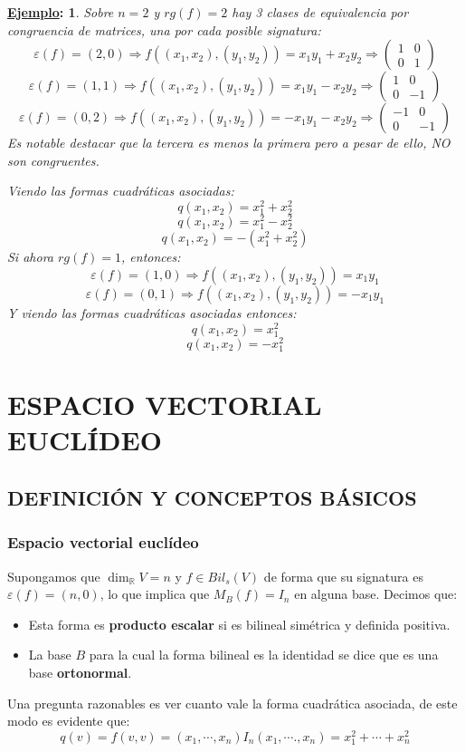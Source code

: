 \documentclass[10pt,a4paper,openright]{book}
\theoremstyle{break}
\newtheorem*{ej}{\underline{Ejemplo}:}
\begin{document}
\begin{ej}
Sobre $n= 2$ y $rg(f)=2$ hay 3 clases de equivalencia por congruencia de matrices, una por cada posible signatura:
$$\varepsilon(f)=(2,0)\Rightarrow f((x_1,x_2),(y_1,y_2)) = x_1y_1+x_2y_2 \Rightarrow \begin{pmatrix} 1 & 0 \\ 0 & 1\end{pmatrix}$$
$$\varepsilon(f)=(1,1)\Rightarrow f((x_1,x_2),(y_1,y_2)) = x_1y_1-x_2y_2 \Rightarrow \begin{pmatrix} 1 & 0 \\ 0 & -1\end{pmatrix}$$
$$\varepsilon(f)=(0,2)\Rightarrow f((x_1,x_2),(y_1,y_2)) = -x_1y_1-x_2y_2 \Rightarrow \begin{pmatrix} -1 & 0 \\ 0 & -1\end{pmatrix}$$
Es notable destacar que la tercera es menos la primera pero a pesar de ello, NO son congruentes.

Viendo las formas cuadráticas asociadas:
$$q(x_1,x_2) = x_1^2+x_2^2$$
$$q(x_1,x_2) = x_1^2-x_2^2$$
$$q(x_1,x_2) = -(x_1^2+x_2^2)$$
Si ahora $rg(f)=1$, entonces:
$$\varepsilon(f)=(1,0)\Rightarrow f((x_1,x_2),(y_1,y_2)) = x_1y_1$$
$$\varepsilon(f)=(0,1)\Rightarrow f((x_1,x_2),(y_1,y_2)) = -x_1y_1$$
Y viendo las formas cuadráticas asociadas entonces:
$$q(x_1,x_2) = x_1^2$$
$$q(x_1,x_2) = -x_1^2$$
\end{ej}

\chapter*{ESPACIO VECTORIAL EUCLÍDEO}
\section*{DEFINICIÓN Y CONCEPTOS BÁSICOS}
\subsection{Espacio vectorial euclídeo}
Supongamos que $\dim_{\mathbb R} V = n$ y $f\in Bil_s(V)$ de forma que su signatura es $\varepsilon(f)=(n,0)$, lo que implica que $M_B(f)=I_n$ en alguna base. Decimos que:
\begin{itemize}
\item Esta forma es \textbf{producto escalar} si es bilineal simétrica y definida positiva.
\item La base $B$ para la cual la forma bilineal es la identidad se dice que es una base \textbf{ortonormal}.
\end{itemize}
Una pregunta razonables es ver cuanto vale la forma cuadrática asociada, de este modo es evidente que:
$$q(v)=f(v,v) = (x_1, \cdots, x_n)I_n(x_1,\cdots., x_n) = x_1^2+\cdots+x_n^2$$
\end{document}
